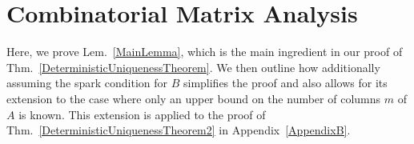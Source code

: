 \documentclass[journal, twocolumn]{IEEEtran}
\begin{document}









 \clearpage

\appendices
\section{Combinatorial Matrix Analysis}\label{appendixA}

Here, we prove Lem.~\ref{MainLemma}, which is the main ingredient in our proof of Thm.~\ref{DeterministicUniquenessTheorem}. We then outline how additionally assuming the spark condition for $B$ simplifies the proof and also allows for its extension to the case where only an upper bound on the number of columns $m$ of $A$ is known. This extension is applied to the proof of  Thm.~\ref{DeterministicUniquenessTheorem2} in Appendix~\ref{AppendixB}. 
\end{document}
